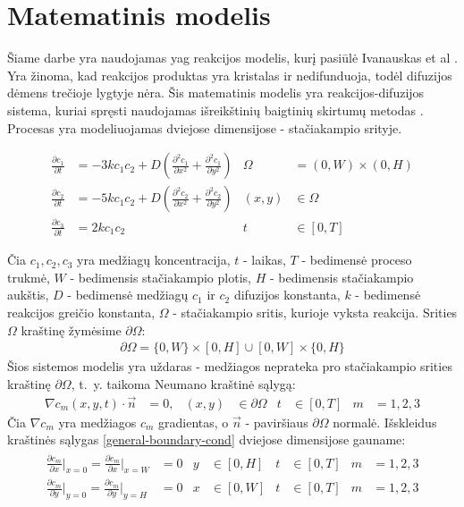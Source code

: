 
\section{Matematinis modelis}

Šiame darbe yra naudojamas \acs{yag} reakcijos modelis, kurį pasiūlė Ivanauskas et al \cite{ivanauskasModellingSolidState2005}. Yra žinoma, kad reakcijos produktas yra kristalas ir nedifunduoja, todėl difuzijos dėmens trečioje lygtyje nėra. Šis matematinis modelis yra reakcijos-difuzijos sistema, kuriai spręsti naudojamas išreikštinių baigtinių skirtumų metodas \cite{pressNumericalRecipes3rd2007}. Procesas yra modeliuojamas dviejose dimensijose - stačiakampio srityje.

\begin{subequations} \label{rect}
	\begin{align}
		\frac{\partial c_1}{\partial t} & =-3kc_1c_2+D\left(\frac{\partial^2c_1}{\partial x^2}+\frac{\partial^2c_1}{\partial y^2}\right) & \Omega&=(0, W)\times(0, H) \\
		\frac{\partial c_2}{\partial t} & =-5kc_1c_2+D\left(\frac{\partial^2c_2}{\partial x^2}+\frac{\partial^2c_2}{\partial y^2}\right) & (x, y)&\in\Omega\\
		\frac{\partial c_3}{\partial t} & =2kc_1c_2 & t &\in[0, T]
	\end{align}
\end{subequations}

Čia $c_1,c_2,c_3$ yra medžiagų koncentracija, $t$ - laikas, $T$ - bedimensė proceso trukmė, $W$ - bedimensis stačiakampio plotis, $H$ - bedimensis stačiakampio aukštis,
$D$ - bedimensė medžiagų $c_1$ ir $c_2$ difuzijos konstanta, $k$ - bedimensė reakcijos greičio konstanta, $\Omega$ - stačiakampio sritis, kurioje vyksta reakcija. Srities $\Omega$ kraštinę žymėsime $\partial\Omega$:
\begin{align*}
    \partial\Omega=\{0, W\}\times[0, H]\cup[0, W]\times\{0, H\}
\end{align*}
Šios sistemos modelis yra uždaras - medžiagos neprateka pro stačiakampio srities kraštinę $\partial\Omega$, t.~y. taikoma Neumano kraštinė sąlygą:
\begin{align} \label{general-boundary-cond}
	\nabla c_m(x, y, t)\cdot\vec{n}&=0, & (x, y)&\in\partial\Omega & t&\in[0, T] & m&=1, 2, 3
\end{align}
Čia $\nabla c_m$ yra medžiagos $c_m$ gradientas, o $\vec{n}$ - paviršiaus $\partial\Omega$ normalė. Išskleidus kraštinės sąlygas \eqref{general-boundary-cond} dviejose dimensijose gauname:
\begin{equation} \label{boundary-cond}
\begin{aligned}
\begin{split}
    \frac{\partial c_m}{\partial x}\Big|_{x=0}=\frac{\partial c_m}{\partial x}\Big|_{x=W}&=0 & y&\in[0,H] & t&\in[0, T] & m&=1, 2, 3\\
    \frac{\partial c_m}{\partial y}\Big|_{y=0}=\frac{\partial c_m}{\partial y}\Big|_{y=H}&=0 & x&\in[0,W] & t&\in[0, T] & m&=1, 2, 3
\end{split}
\end{aligned}
\end{equation}

